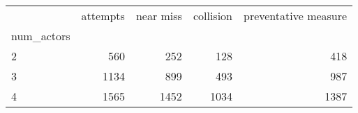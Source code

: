 \begin{tabular}{lrrrr}
\toprule
{} &  attempts &  near miss &  collision &  preventative measure \\
num\_actors &           &            &            &                       \\
\midrule
2          &       560 &        252 &        128 &                   418 \\
3          &      1134 &        899 &        493 &                   987 \\
4          &      1565 &       1452 &       1034 &                  1387 \\
\bottomrule
\end{tabular}
